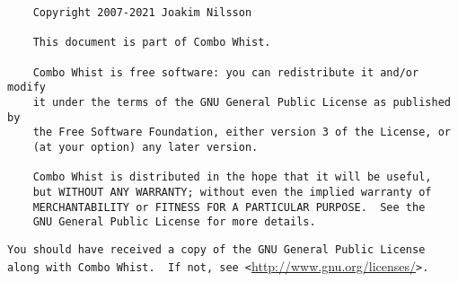 %
%
%
%

\begin{verbatim}
	Copyright 2007-2021 Joakim Nilsson

	This document is part of Combo Whist.

	Combo Whist is free software: you can redistribute it and/or modify
	it under the terms of the GNU General Public License as published by
	the Free Software Foundation, either version 3 of the License, or
	(at your option) any later version.

	Combo Whist is distributed in the hope that it will be useful,
	but WITHOUT ANY WARRANTY; without even the implied warranty of
	MERCHANTABILITY or FITNESS FOR A PARTICULAR PURPOSE.  See the
	GNU General Public License for more details.
\end{verbatim}
\verb|You should have received a copy of the GNU General Public License|\\
\verb|along with Combo Whist.  If not, see <|\url{http://www.gnu.org/licenses/}\verb|>.|
